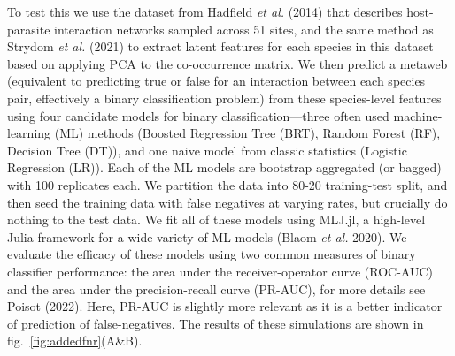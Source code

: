 \documentclass[11pt]{article}
\begin{document}
To test this we use the dataset from Hadfield \emph{et al.} (2014) that
describes host-parasite interaction networks sampled across 51 sites,
and the same method as Strydom \emph{et al.} (2021) to extract latent
features for each species in this dataset based on applying PCA to the
co-occurrence matrix. We then predict a metaweb (equivalent to
predicting true or false for an interaction between each species pair,
effectively a binary classification problem) from these species-level
features using four candidate models for binary classification---three
often used machine-learning (ML) methods (Boosted Regression Tree (BRT),
Random Forest (RF), Decision Tree (DT)), and one naive model from
classic statistics (Logistic Regression (LR)). Each of the ML models are
bootstrap aggregated (or bagged) with 100 replicates each. We partition
the data into 80-20 training-test split, and then seed the training data
with false negatives at varying rates, but crucially do nothing to the
test data. We fit all of these models using MLJ.jl, a high-level Julia
framework for a wide-variety of ML models (Blaom \emph{et al.} 2020). We
evaluate the efficacy of these models using two common measures of
binary classifier performance: the area under the receiver-operator
curve (ROC-AUC) and the area under the precision-recall curve (PR-AUC),
for more details see Poisot (2022). Here, PR-AUC is slightly more
relevant as it is a better indicator of prediction of false-negatives.
The results of these simulations are shown in
fig.~\ref{fig:addedfnr}(A\&B).
\end{document}
